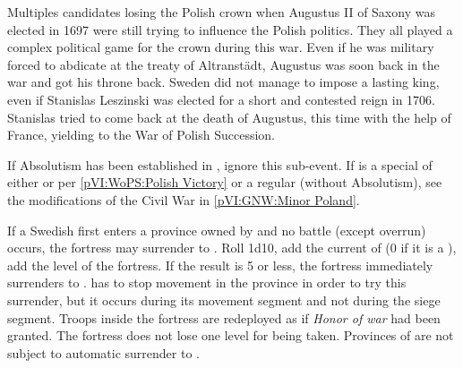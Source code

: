 \begin{digressions}
  \begin{histoire}
    Multiples candidates losing the Polish crown when Augustus II of Saxony
    was elected in 1697 were still trying to influence the Polish
    politics. They all played a complex political game for the crown during
    this war. Even if he was military forced to abdicate at the treaty of
    Altranst\"{a}dt, Augustus was soon back in the war and got his throne
    back. Sweden did not manage to impose a lasting king, even if Stanislas
    Leszinski was elected for a short and contested reign in 1706. Stanislas
    tried to come back at the death of Augustus, this time with the help of
    France, yielding to the War of Polish Succession.
  \end{histoire}

  \condition{}
  \aparag If Absolutism has been established in \POL, ignore this sub-event.
  \aparag If \payspologne is a special \EW of either \FRA or \SUE per
  \ref{pVI:WoPS:Polish Victory} or a regular \MIN (without Absolutism), see
  the modifications of the Civil War in \ref{pVI:GNW:Minor Poland}.

  \phmil
  \aparag If a Swedish \ARMY first enters a province owned by \POL and no
  battle (except overrun) occurs, the fortress may surrender to \SUE.
  \bparag Roll 1d10, add the current \STAB of \POL (0 if it is a \MIN), add
  the level of the fortress. If the result is 5 or less, the fortress
  immediately surrenders to \SUE.
  \bparag \SUE has to stop movement in the province in order to try this
  surrender, but it occurs during its movement segment and not during the
  siege segment.
  \bparag Troops inside the fortress are redeployed as if \emph{Honor of war}
  had been granted. The fortress does not lose one level for being taken.
  \bparag Provinces of \payssaxe are not subject to automatic surrender to
  \SUE.


\end{digressions}
